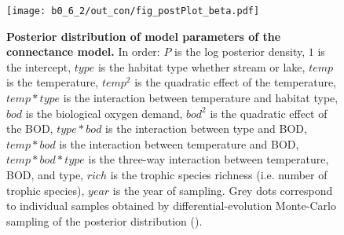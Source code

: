 \documentclass[11pt, oneside]{article}
\begin{document}
\begin{figure}[H]
\begin{center}
\texttt{[image: b0\_6\_2/out\_con/fig\_postPlot\_beta.pdf]}
\caption{
    \textbf{Posterior distribution of model parameters of the connectance model.}
    In order: $P$ is the log posterior density, $1$ is the intercept, $type$ is the habitat type whether stream or lake, $temp$ is the temperature, $temp^2$ is the quadratic effect of the temperature, $temp * type$ is the interaction between temperature and habitat type, $bod$ is the biological oxygen demand, $bod^2$ is the quadratic effect of the BOD, $type * bod$ is the interaction between type and BOD, $temp * bod$ is the interaction between temperature and BOD, $temp * bod * type$ is the three-way interaction between temperature, BOD, and type, $rich$ is the trophic species richness (i.e. number of trophic species), $year$ is the year of sampling.
    Grey dots correspond to individual samples obtained by differential-evolution Monte-Carlo sampling of the posterior distribution (\cite{TerBraak2006}). 
} 
\end{center}
\end{figure}
\end{document}
